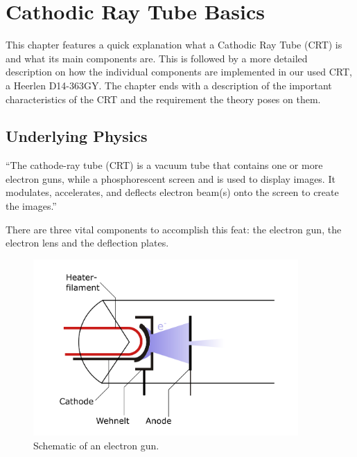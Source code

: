 
\chapter{Cathodic Ray Tube Basics}
\label{ch:Cathodic Ray Tube Basics}

This chapter features a quick explanation what a Cathodic Ray Tube (CRT) is and what its main components are. This is followed by a more detailed description on how the individual components are implemented in our used CRT, a Heerlen D14-363GY. The chapter ends with a description of the important characteristics of the CRT and the requirement the theory poses on them.

\section{Underlying Physics}


``The cathode-ray tube (CRT) is a vacuum tube that contains one or more electron guns, while a phosphorescent screen and is used to display images. It modulates, accelerates, and deflects electron beam(s) onto the screen to create the images.''


There are three vital components to accomplish this feat: the electron gun, the electron lens and the deflection plates.

\begin{figure}
	\centering
	\includegraphics[width=0.9\textwidth]{Chapters/CRT-Basics/electron_gun}
	\caption{Schematic of an electron gun.}
	\label{fig:electrongun}
\end{figure}

